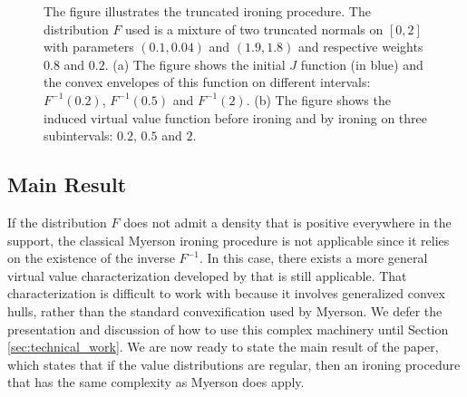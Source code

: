 \begin{figure}[h!]
{
    }
    \caption{ 
    The figure illustrates the truncated ironing procedure. The distribution $F$ used is a mixture of two truncated normals on $[0,2]$ with parameters $(0.1,0.04)$ and $(1.9,1.8)$ and respective weights $0.8$ and $0.2$.  (a) The figure shows the initial $J$ function (in blue) and the convex envelopes of this function on different intervals: $F^{-1}(0.2)$, $F^{-1}(0.5)$ and $F^{-1}(2)$.  (b) The figure shows the induced virtual value function before ironing and by ironing on three subintervals: $0.2$, $0.5$ and $2$.} 
    \label{fig:ironing_operator}
    \end{figure}


\subsection{Main Result}\label{sec:main}

If the distribution $F$ does not admit a density that is positive everywhere in the support, the classical Myerson ironing procedure is not applicable since it relies on the existence of the inverse $F^{-1}$. In this case, there exists a more general virtual value characterization developed by \citet{monteiro2010optimal} that is still applicable. That characterization is difficult to work with because it involves generalized convex hulls, rather than the standard convexification used by Myerson. We defer the presentation and discussion of how to use this complex machinery until Section \ref{sec:technical_work}. We are now ready to state the main result of the paper, which states that if the value distributions are regular, then an ironing procedure that has the same complexity as Myerson does apply. 


